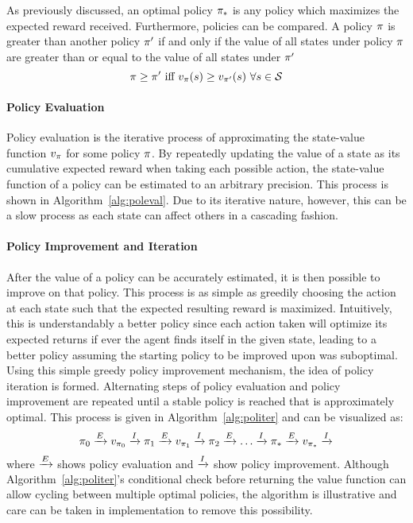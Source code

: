 As previously discussed,
an optimal policy $\pi_*$ is any policy which maximizes the expected reward
received.
%
Furthermore, policies can be compared.
%
A policy $\pi$ is greater than another policy $\pi'$
if and only if the value of all states under policy $\pi$
are greater than or equal to the value of all states under $\pi'$
\[
\policy \ge \policy'\ 
	\text{iff}\ 
	v_\policy(s) \ge v_{\policy'}(s)\ \forall s\in\States
\]


\paragraph*{Policy Evaluation}


Policy evaluation is the iterative process of approximating the state-value
function $v_\pi$ for some policy $\pi$.
%
By repeatedly updating the value of a state
as its cumulative expected reward when taking each possible action,
the state-value function of a policy can be estimated to an
arbitrary precision.
%
This process is shown in Algorithm~\ref{alg:poleval}.
%
Due to its iterative nature,
however,
this can be a slow process
as each state can affect others in a cascading fashion.



\paragraph*{Policy Improvement and Iteration}



After the value of a policy can be accurately estimated,
it is then possible to improve on that policy.
% 
This process is as simple as greedily choosing the action at each state such
that the expected resulting reward is maximized.
%
Intuitively,
this is understandably a better policy
since each action taken will optimize its expected returns if ever the
agent finds itself in the given state,
leading to a better policy
assuming the starting policy to be improved upon was suboptimal.
%
Using this simple greedy policy improvement mechanism,
the idea of policy iteration is formed.
%
Alternating steps of policy evaluation and policy improvement are repeated
until a stable policy is reached that is approximately optimal.
%
This process is given in Algorithm~\ref{alg:politer}
and can be visualized as:
\[
	\pi_0 \xrightarrow{E} v_{\pi_0} \xrightarrow{I}
	\pi_1 \xrightarrow{E} v_{\pi_1} \xrightarrow{I}
	\pi_2 \xrightarrow{E} \ldots \xrightarrow{I}
	\pi_* \xrightarrow{E} v_{\pi_*} \xrightarrow{I}
\]
where $\xrightarrow{E}$ shows policy evaluation and $\xrightarrow{I}$ show policy improvement.
%
Although Algorithm~\ref{alg:politer}'s conditional check before
returning the value function can allow cycling between multiple optimal
policies,
the algorithm is illustrative
and care can be taken in implementation to remove this possibility.

